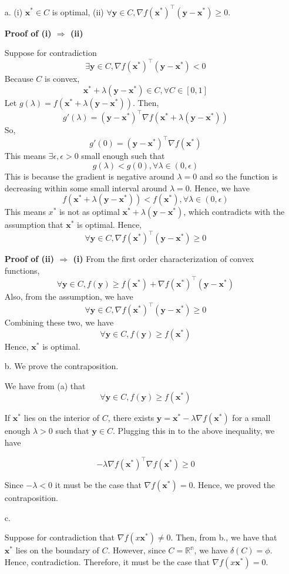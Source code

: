 \documentclass[11pt]{article}
\theoremstyle{remark}
\newcommand{\bx}{\mathbf{x}}
\newcommand{\by}{\mathbf{y}}
\begin{document}
\color{blue}
\begin{enumerate}
\item[a.]
(i) $\bx^* \in C$ is optimal, (ii) $\forall \by \in C, \nabla f(\bx^*)^\intercal (\by-\bx^*) \geq 0$.

\textbf{Proof of (i) $\Rightarrow$ (ii)}

Suppose for contradiction $$\exists \by \in C, \nabla f(\bx^*)^\intercal (\by-\bx^*) < 0$$
 Because $C$ is convex, 
 $$\bx^*+\lambda(\by-\bx^*)\in C, \forall C \in [0,1]$$
 Let $g(\lambda)=f(\bx^*+\lambda(\by-\bx^*))$. Then, 
 $$g'(\lambda) = (\by-\bx^*)^\intercal \nabla f(\bx^*+\lambda(\by-\bx^*))$$
So,
 $$g'(0) = (\by-\bx^*)^\intercal \nabla f(\bx^*)$$
 This means $\exists \epsilon, \epsilon > 0$ small enough such that
 $$g(\lambda) < g(0), \forall \lambda \in (0,\epsilon)$$
 This is because the gradient is negative around $\lambda =0$ and so the function is decreasing within some small interval around $\lambda=0$.
 Hence, we have
 $$f(\bx^* + \lambda (\by-\bx^*)) < f(\bx^*), \forall \lambda \in (0,\epsilon)$$
This means $x^*$ is not as optimal $\bx^* + \lambda (\by-\bx^*)$, which contradicts with the assumption that $\bx^*$ is optimal.
Hence, 
$$\forall \by \in C, \nabla f(\bx^*)^\intercal (\by-\bx^*) \geq 0$$

\textbf{Proof of (ii) $\Rightarrow$ (i)}
From the first order characterization of convex functions,
$$\forall \by \in C, f(\by) \geq f(\bx^*) + \nabla f(\bx^*)^\intercal (\by-\bx^*)$$
Also, from the assumption, we have
$$\forall \by \in C, \nabla f(\bx^*)^\intercal (\by-\bx^*) \geq 0$$
Combining these two, we have
$$\forall \by \in C, f(\by) \geq f(\bx^*)$$
Hence, $\bx^*$ is optimal.

\item[b.]
We prove the contraposition. 

We have from (a) that 
$$\forall \by \in C, f(\by) \geq f(\bx^*)$$

If $\bx^*$ lies on the interior of $C$, there exists $\by=\bx^*-\lambda \nabla f(\bx^*)$ for a small enough $\lambda > 0$ such that $\by \in C$.  Plugging this in to the above inequality, we have

$$-\lambda \nabla f(\bx^*)^\intercal \nabla f(\bx^*) \geq 0$$

Since $-\lambda < 0$ it must be the case that $\nabla f(\bx^*) = 0$. Hence, we proved the contraposition.

\item[c.]

Suppose for contradiction that $\nabla f(x\bx^*) \neq 0$. Then, from b., we have that $\bx^*$ lies on the boundary of $C$. However, since $C=\mathbb{R^n}$, we have $\delta(C)=\phi$. Hence, contradiction. Therefore, it must be the case that $\nabla f(x\bx^*) = 0$.

\end{enumerate}
\color{black}
\end{document}
